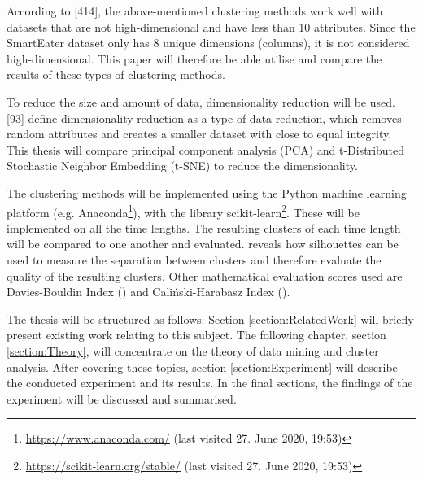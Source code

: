 According to \textcite{han2011data}[414], the above-mentioned clustering methods work well with datasets that are not high-dimensional and have less than 10 attributes. Since the SmartEater dataset only has 8 unique dimensions (columns), it is not considered high-dimensional. This paper will therefore be able utilise and compare the results of these types of clustering methods. 

To reduce the size and amount of data, dimensionality reduction will be used. \textcite{han2011data}[93] define dimensionality reduction as a type of data reduction, which removes random attributes and creates a smaller dataset with close to equal integrity. This thesis will compare principal component analysis (PCA) and t-Distributed Stochastic Neighbor Embedding (t-SNE) to reduce the dimensionality.

The clustering methods will be implemented using the Python machine learning platform (e.g. Anaconda\footnote{\url{https://www.anaconda.com/} (last visited 27. June 2020, 19:53)}), with the library scikit-learn\footnote{\url{https://scikit-learn.org/stable/} (last visited 27. June 2020, 19:53)}. These will be implemented on all the time lengths. The resulting clusters of each time length will be compared to one another and evaluated. 
\textcite{rousseeuw1987silhouettes} reveals how silhouettes can be used to measure the separation between clusters and therefore evaluate the quality of the resulting clusters. Other mathematical evaluation scores used are Davies-Bouldin Index (\textcite{DaviesBouldin}) and Caliński-Harabasz Index (\textcite{calinskiHarabasz}).

The thesis will be structured as follows: Section \ref{section:RelatedWork} will briefly present existing work relating to this subject. The following chapter, section \ref{section:Theory}, will concentrate on the theory of data mining and cluster analysis. After covering these topics, section \ref{section:Experiment} will describe the conducted experiment and its results. In the final sections, the findings of the experiment will be discussed and summarised. 

